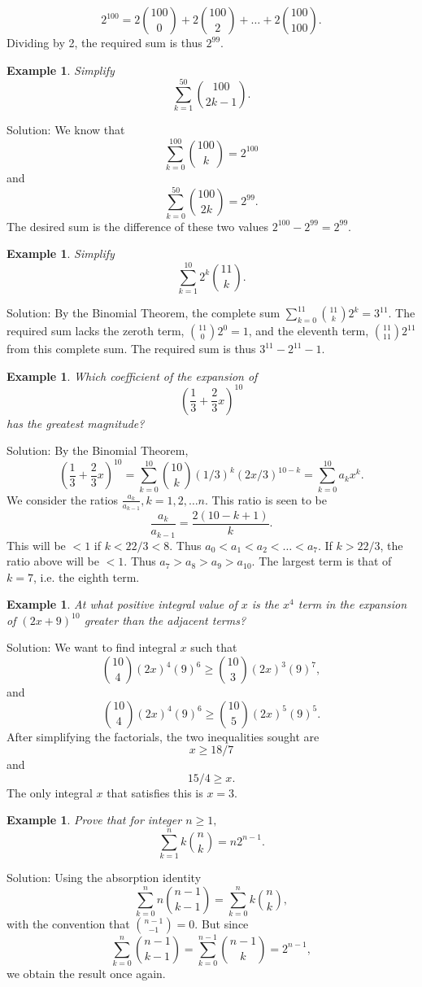 \documentclass[11pt, openany]{book}
\theoremstyle{change} \theoremheaderfont{\blue\sffamily\bfseries}
\newtheorem{exa}[thm]{Example}
\theoremstyle{nonumberplain} \theoremheaderfont{\sffamily\bfseries}
\def\binom#1#2{{#1\choose#2}}
\newcommand{\í}{\'{\i}}
\begin{document}
$$ 2^{100} = 2\binom{100}{0} + 2\binom{100}{2} +  \ldots + 2\binom{100}{100}.$$
Dividing by 2, the required sum is thus $2^{99}.$
\begin{exa}Simplify $$\sum _{k = 1} ^{50} \binom{100}{2k - 1}.$$ \end{exa}
Solution: We know that $$\sum _{k = 0} ^{100} \binom{100}{k} =
2^{100}$$ and $$\sum _{k = 0} ^{50} \binom{100}{2k} = 2^{99}.$$The
desired sum is the difference of these two values $2^{100} -
2^{99} = 2^{99}.$
\begin{exa} Simplify$$\sum_ {k = 1}^{10} 2^k \binom{11}{k}.$$ \end{exa}
Solution: By the Binomial Theorem, the complete sum $\sum _{k = 0}
^{11} \binom{11}{k}2^k = 3^{11}$. The required sum lacks the
zeroth term, $\binom{11}{0}2^0 = 1$, and the eleventh term,
$\binom{11}{11}2^{11}$ from this complete sum. The required sum is
thus $3^{11} - 2^{11} - 1$.
\begin{exa} Which coefficient of the expansion of $$ \left(\frac{1}{3} +
\frac{2}{3}x\right)^{10}$$ has the greatest magnitude? \end{exa}
Solution: By the Binomial Theorem,
$$\left(\frac{1}{3} + \frac{2}{3}x\right)^{10} = \sum _{k = 0} ^{10} \binom{10}{k}(1/3)^{k}(2x/3)^{10 - k} =  \sum _{k = 0} ^{10} a_k x^k .$$
We consider the ratios $\frac{a_k}{a_{k - 1}}, k = 1, 2, \ldots
n$. This ratio is seen to be $$ \frac{a_k}{a_{k - 1}} = \frac{2(10
- k + 1)}{k}.$$ This will be $< 1$ if $k < 22/3 < 8.$ Thus $a_0 <
a_1 < a_2 < \ldots < a_7$. If $k > 22/3$, the ratio above will be
$< 1.$ Thus $a_7 > a_8 > a_9 > a_{10}$. The largest term is that
of $k = 7$, i.e. the eighth term.
\begin{exa} At what positive integral value of $x$ is the $x^4$ term in the
expansion of $(2x + 9)^{10}$ greater than the adjacent
terms?\end{exa} Solution: We want to find integral $x$ such that
$$ \binom{10}{4}(2x)^4 (9)^6 \geq \binom{10}{3}(2x)^3 (9)^7,$$ and
$$ \binom{10}{4}(2x)^4 (9)^6  \geq \binom{10}{5}(2x)^5 (9)^5
.$$After simplifying the factorials, the two inequalities sought
are $$ x \geq 18/7 $$ and $$ 15/4 \geq x.$$ The only integral $x$
that satisfies this is $x = 3.$
\begin{exa} Prove that for integer $n \geq 1,$
$$ \sum _{k = 1} ^n k\binom{n}{k} = n2^{n - 1}.$$ \end{exa}
Solution:  Using the absorption identity $$   \sum _{k = 0} ^{n}
n\binom{n - 1}{k - 1} = \sum _{k = 0} ^n k\binom{n}{k},
$$with the convention that $\binom{n - 1}{-1} = 0$. But since
$$\sum _{k = 0} ^{n} \binom{n - 1}{k - 1} = \sum _{k = 0} ^{n - 1}
\binom{n - 1}{k} = 2^{n - 1},$$ we obtain the result once again.
\end{document}
